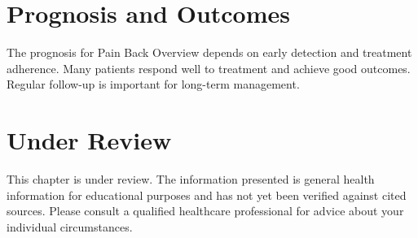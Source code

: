 \section*{Prognosis and Outcomes}
The prognosis for Pain Back Overview depends on early detection and treatment adherence. Many patients respond well to treatment and achieve good outcomes. Regular follow-up is important for long-term management.
\section*{Under Review}
This chapter is under review. The information presented is general health information for educational purposes and has not yet been verified against cited sources. Please consult a qualified healthcare professional for advice about your individual circumstances.


\clearpage
